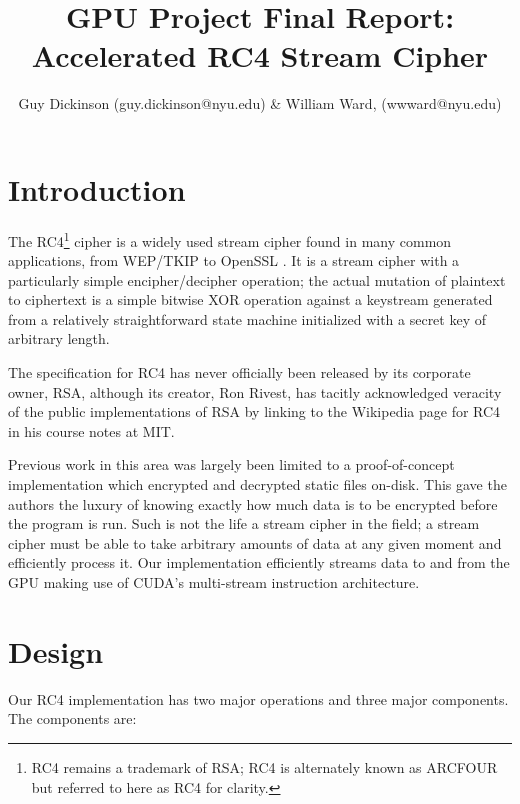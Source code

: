 \documentclass[twocolumn]{article}
\begin{document}
  
  \title{GPU Project Final Report: Accelerated RC4 Stream Cipher}
  \author{Guy Dickinson (guy.dickinson@nyu.edu) \& William Ward, (wwward@nyu.edu)}
  \maketitle
  
  \section{Introduction}
  The RC4\footnote{RC4 remains a trademark of RSA; RC4 is alternately known as ARCFOUR but referred to here as RC4 for clarity.} cipher is a widely used stream cipher found in many common applications, from WEP/TKIP \cite[p. 171]{cisco-netsec} to OpenSSL \cite{openssl}. It is a stream cipher with a particularly simple encipher/decipher operation; the actual mutation of plaintext to ciphertext is a simple bitwise XOR operation against a keystream generated from a relatively straightforward state machine initialized with a secret key of arbitrary length.
  
  The specification for RC4 has never officially been released by its corporate owner, RSA, although its creator, Ron Rivest, has tacitly acknowledged veracity of the public implementations of RSA by linking to the Wikipedia page for RC4 in his course notes at MIT.\cite{rivest-notes}
  
  Previous work in this area \cite{5276924} was largely been limited to a proof-of-concept implementation which encrypted and decrypted static files on-disk. This gave the authors the luxury of knowing exactly how much data is to be encrypted before the program is run. Such is not the life a stream cipher in the field; a stream cipher must be able to take arbitrary amounts of data at any given moment and efficiently process it. Our implementation efficiently streams data to and from the GPU making use of CUDA's multi-stream instruction architecture. 
  
  \section{Design}
  
  Our RC4 implementation has two major operations and three major components. The components are:
  
\end{document}
